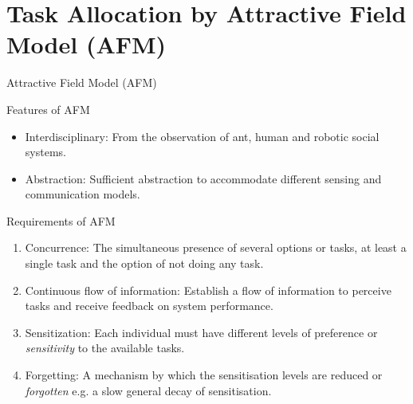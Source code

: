\documentclass[handout,draft]{beamer}
\begin{document}
\section{Task Allocation by Attractive Field Model (AFM)}
\begin{frame}[t]{Attractive Field Model (AFM)}	
\begin{block}{Features of AFM}
\begin{itemize}
\item \alert{Interdisciplinary:} \small From the observation of ant, human and robotic social systems. 
\item \alert{Abstraction:} \small Sufficient abstraction to accommodate different sensing and communication models.
\end{itemize}
\end{block}
  	
\begin{block}{Requirements of AFM}
\begin{enumerate}
\item \normalsize  \alert{Concurrence:} \small The simultaneous presence of several options or tasks, at least a single task and the option of not doing any task. 
\item \normalsize  \alert{Continuous flow of information:} \small Establish a flow of information to perceive tasks and receive feedback on system performance.
\item \normalsize  \alert{Sensitization:} \small Each individual must have different levels of preference or {\em sensitivity} to the available tasks.
\item \normalsize  \alert{Forgetting:} \small A mechanism by which the sensitisation levels are reduced or {\em forgotten} e.g. a slow general decay of sensitisation.
\end{enumerate}
\end{block}  	
\end{frame}
\end{document}
